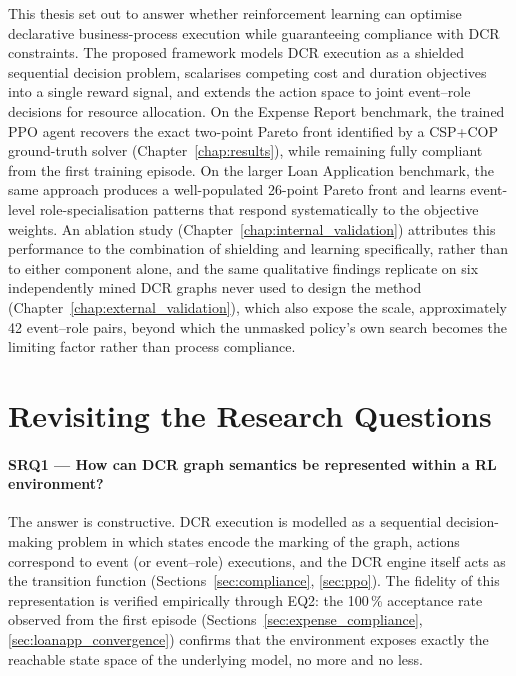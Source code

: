 This thesis set out to answer whether reinforcement learning can optimise declarative business-process execution while guaranteeing compliance with \ac{DCR} constraints. The proposed framework models \ac{DCR} execution as a shielded sequential decision problem, scalarises competing cost and duration objectives into a single reward signal, and extends the action space to joint event--role decisions for resource allocation. On the Expense Report benchmark, the trained \ac{PPO} agent recovers the exact two-point Pareto front identified by a CSP+COP ground-truth solver (Chapter~\ref{chap:results}), while remaining fully compliant from the first training episode. On the larger Loan Application benchmark, the same approach produces a well-populated 26-point Pareto front and learns event-level role-specialisation patterns that respond systematically to the objective weights. An ablation study (Chapter~\ref{chap:internal_validation}) attributes this performance to the combination of shielding and learning specifically, rather than to either component alone, and the same qualitative findings replicate on six independently mined \ac{DCR} graphs never used to design the method (Chapter~\ref{chap:external_validation}), which also expose the scale, approximately 42 event--role pairs, beyond which the unmasked policy's own search becomes the limiting factor rather than process compliance.

\section{Revisiting the Research Questions}
\label{sec:eq_revisited}

\paragraph{SRQ1 --- How can \ac{DCR} graph semantics be represented within a \ac{RL} environment?} The answer is constructive. \ac{DCR} execution is modelled as a sequential decision-making problem in which states encode the marking of the graph, actions correspond to event (or event--role) executions, and the \ac{DCR} engine itself acts as the transition function (Sections~\ref{sec:compliance}, \ref{sec:ppo}). The fidelity of this representation is verified empirically through EQ2: the 100\,\% acceptance rate observed from the first episode (Sections~\ref{sec:expense_compliance}, \ref{sec:loanapp_convergence}) confirms that the environment exposes exactly the reachable state space of the underlying model, no more and no less.

